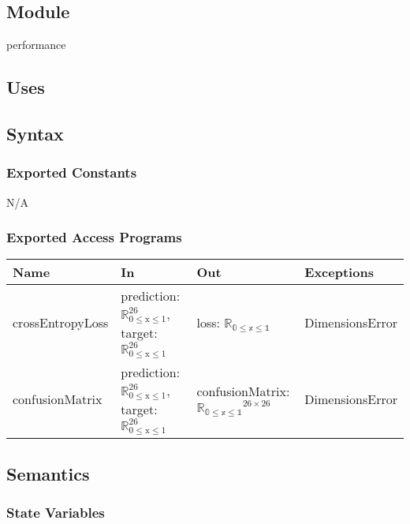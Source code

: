 \documentclass[12pt, titlepage]{article}
\begin{document}
\begin{itemize}
\subsection{Module}

performance

\subsection{Uses}


\subsection{Syntax}

\subsubsection{Exported Constants}

N/A

\subsubsection{Exported Access Programs}

\begin{center}
\begin{tabular}{p{4cm} p{4cm} p{4cm} p{2cm}}
\hline
\textbf{Name} & \textbf{In} & \textbf{Out} & \textbf{Exceptions} \\
\hline
crossEntropyLoss & prediction: $\mathbb{R}_{\text{0} \leq \text{x} \leq \text{1}}^{26}$, target: $\mathbb{R}_{\text{0} \leq \text{x} \leq \text{1}}^{26}$ & loss: $\mathbb{R_{\text{0} \leq \text{x} \leq \text{1}}}$ & DimensionsError \\
confusionMatrix & prediction: $\mathbb{R}_{\text{0} \leq \text{x} \leq \text{1}}^{26}$, target: $\mathbb{R}_{\text{0} \leq \text{x} \leq \text{1}}^{26}$ & confusionMatrix: $\mathbb{R_{\text{0} \leq \text{x} \leq \text{1}}}^{26 \times 26}$ & DimensionsError \\
\hline
\end{tabular}
\end{center}

\subsection{Semantics}

\subsubsection{State Variables}


\end{itemize}
\end{document}
